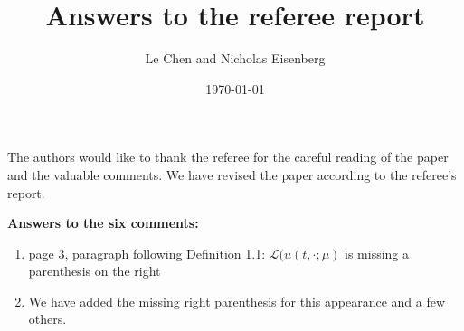 \documentclass[12pt]{article} %
\theoremstyle{plain}
\theoremstyle{definition}
\numberwithin{equation}{section}
\begin{document}
\title{Answers to the referee report}

\author{Le Chen and Nicholas Eisenberg}
\date{\today}
\maketitle

The authors would like to thank the referee for the careful reading of the paper
and the valuable comments. We have revised the paper according to the referee's
report.

\bigskip\noindent\textbf{Answers to the six comments:}

\begin{enumerate}[(1)]
  \setlength{\itemsep}{10pt}

  \item[1.] page 3, paragraph following Definition 1.1:
    $\mathscr{L}(u(t,\cdot;\mu)$ is missing a parenthesis on the right
  \item[A:] We have added the missing right parenthesis for this appearance and
    a few others.



\end{enumerate}
\end{document}
